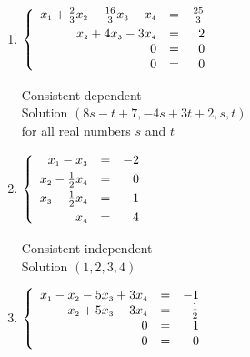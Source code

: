 \documentclass{ximera}
\begin{document}
\begin{enumerate}
Consistent dependent\\
Solution $\left(-2t - \frac{35}{4},-t - \frac{11}{2},t\right)$\\
for all real numbers $t$




\item  $\left\{ \begin{array}{rcr} x_{\mbox{\tiny$1$}} + \frac{2}{3}x_{\mbox{\tiny$2$}} - \frac{16}{3}x_{\mbox{\tiny$3$}} -  x_{\mbox{\tiny$4$}} & = & \frac{25}{3} \\ [3pt]
x_{\mbox{\tiny$2$}} + 4x_{\mbox{\tiny$3$}} - 3x_{\mbox{\tiny$4$}} & = & 2  \\  
0 & = & 0 \\
0 & = & 0  \end{array} \right.$

Consistent dependent\\
Solution $(8s - t + 7, -4s + 3t + 2, s, t)$\\
for all real numbers $s$ and $t$



\item  $\left\{ \begin{array}{rcr} x_{\mbox{\tiny$1$}} - x_{\mbox{\tiny$3$}} & = & -2 \\ [3pt]
x_{\mbox{\tiny$2$}} - \frac{1}{2}x_{\mbox{\tiny$4$}} & = & 0  \\ [3pt]
x_{\mbox{\tiny$3$}} - \frac{1}{2} x_{\mbox{\tiny$4$}} & = & 1 \\ [3pt]
x_{\mbox{\tiny$4$}} & = & 4  \end{array} \right.$

Consistent independent\\
Solution $(1, 2, 3, 4)$



\item  $\left\{ \begin{array}{rcr} x_{\mbox{\tiny$1$}} - x_{\mbox{\tiny$2$}} - 5x_{\mbox{\tiny$3$}} +  3x_{\mbox{\tiny$4$}} & = & -1 \\ 
x_{\mbox{\tiny$2$}} + 5x_{\mbox{\tiny$3$}} - 3x_{\mbox{\tiny$4$}} & = & \frac{1}{2}  \\  
0 & = & 1 \\
0 & = & 0 \end{array} \right.$


\end{enumerate}
\end{document}
